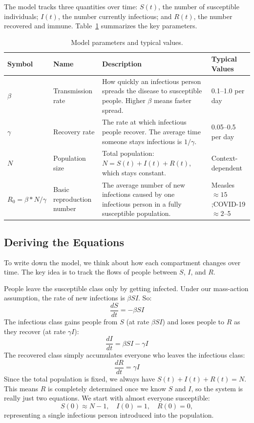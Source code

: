 \documentclass[11pt]{article}
\begin{document}
The model tracks three quantities over time: $S(t)$, the number of susceptible individuals; $I(t)$, the number currently infectious; and $R(t)$, the number recovered and immune. Table~\ref{tab:params} summarizes the key parameters.

\begin{table}[h!]
\centering
\small
\renewcommand{\arraystretch}{1.2}
\begin{tabular}{>{\bfseries}p{1.3cm} p{2.8cm} p{6.5cm} p{2.8cm}}
\toprule
Symbol & Name & Description & Typical Values \\
\midrule
$\beta$ & Transmission rate & How quickly an infectious person spreads the disease to susceptible people. Higher $\beta$ means faster spread. & 0.1--1.0 per day \\
$\gamma$ & Recovery rate & The rate at which infectious people recover. The average time someone stays infectious is $1/\gamma$. & 0.05--0.5 per day \\
$N$ & Population size & Total population: $N = S(t) + I(t) + R(t)$, which stays constant. & Context-dependent \\
$R_0= \beta*N/\gamma$ & Basic reproduction number & The average number of new infections caused by one infectious person in a fully susceptible population. & Measles $\approx 15$\cite{anderson1982};\newline COVID-19 $\approx 2$--5\cite{crawford} \\
\bottomrule
\end{tabular}
\caption{Model parameters and typical values.}
\label{tab:params}
\end{table}

\subsection{Deriving the Equations}
\enlargethispage{\baselineskip} %

To write down the model, we think about how each compartment changes over time. The key idea is to track the flows of people between $S$, $I$, and $R$.

People leave the susceptible class only by getting infected. Under our mass-action assumption, the rate of new infections is $\beta SI$. So:
\begin{equation}
    \frac{dS}{dt} = -\beta S I
\end{equation}
The infectious class gains people from $S$ (at rate $\beta SI$) and loses people to $R$ as they recover (at rate $\gamma I$):
\begin{equation}
    \frac{dI}{dt} = \beta S I - \gamma I
\end{equation}
The recovered class simply accumulates everyone who leaves the infectious class:
\begin{equation}
    \frac{dR}{dt} = \gamma I
\end{equation}
Since the total population is fixed, we always have $S(t) + I(t) + R(t) = N$. This means $R$ is completely determined once we know $S$ and $I$, so the system is really just two equations. We start with almost everyone susceptible:
\[
S(0) \approx N - 1, \quad I(0) = 1, \quad R(0) = 0,
\]
representing a single infectious person introduced into the population.
\end{document}
